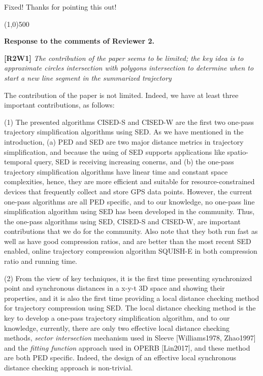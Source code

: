 \documentclass{letter}
\begin{document}
{Fixed! Thanks for pointing this out!

\line(1,0){500}

\textbf{Response to the comments of Reviewer 2.}

\textbf{[R2W1]} \emph{The contribution of the paper seems to be limited; the key idea is to approximate circles intersection with polygons intersection to determine when to start a new line segment in the summarized trajectory}

The contribution of the paper is not limited. Indeed, we have at least three important contributions, as follows:

(1) The presented algorithms CISED-S and CISED-W are the first two one-pass trajectory simplification algorithms using SED. As we have mentioned in the introduction, (a) PED and SED are two major distance metrics in trajectory simplification, and because the using of SED supports applications like spatio-temporal query, SED is receiving increasing conerns, and (b) the one-pass trajectory simplification algorithms have linear time and constant space complexities, hence, they are more efficient and suitable for resource-constrained devices that frequently collect and store GPS data points. However, the current one-pass algorithms are all PED specific, and to our knowledge, no one-pass line simplification algorithm using SED has been developed in the community. Thus, the one-pass algorithms using SED, CISED-S and CISED-W, are important contributions that we do for the community. Also note that they both run fast as well as have good compression ratios, and are better than the most recent SED enabled, online trajectory compression algorithm SQUISH-E in both compression ratio and running time.

(2) From the view of key techniques, it is the first time presenting synchronized point and synchronous distances in a x-y-t 3D space and showing their properties, and it is also the first time providing a local distance checking method for trajectory compression using SED. The local distance checking method is the key to develop a one-pass trajectory simplification algorithm, and to our knowledge, currently, there are only two effective local distance checking methods, \textit{sector intersection} mechanism used in Sleeve [Williams1978, Zhao1997] and the \textit{fitting function} approach used in OPERB [Lin2017], and these method are both PED specific. Indeed, the design of an effective local synchronous distance checking approach is non-trivial.}
\end{document}
